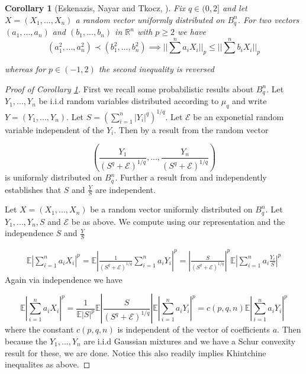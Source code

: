 \documentclass[10pt]{article}
\newcommand{\E}{\mathbb{E}}
\newcommand{\1}{\textbf{1}}
\newcommand{\R}{\mathbb{R}}
\newcommand{\normOne}[1]{\left\lvert#1\right\rvert}
\newtheorem{corollary}[theorem]{Corollary}
\theoremstyle{remark}
\theoremstyle{definition}
\begin{document}
\begin{corollary}[Eskenazis, Nayar and Tkocz, \cite{ENT}]\label{cor:ENT4}
	Fix $q \in (0,2]$ and let $X = (X_1,...,X_n)$ a random vector uniformly distributed on $B_q^n$. For two vectors $(a_1,...,a_n)$ and $(b_1,...,b_n)$ in $\R^n$ with $p \geq 2$ we have
	\begin{equation*}
		(a_1^2,...,a_n^2) \prec (b_1^2,...,b_n^2) \implies ||\sum^n a_i X_i||_p \leq ||\sum^n b_i X_i||_p
	\end{equation*}

	whereas for $p \in (-1,2)$ the second inequality is reversed
\end{corollary}

\begin{proof}[Proof of Corollary \ref{cor:ENT4}]

First we recall some probabilistic results about $B_q^n$. Let $Y_1,...,Y_n$ be i.i.d random variables distributed according to $\mu_q$ and write $Y = (Y_1,...,Y_n)$. Let $S = (\sum_{i=1}^n|Y_i|^q)^{1/q}$. Let $\mathcal{E}$ be an exponetial random variable independent of the $Y_i$. Then by a result from \cite{BGMN} the random vector


\begin{equation*}
	(\frac{Y_1}{(S^q+\mathcal{E})^{1/q}},...,\frac{Y_n}{(S^q+\mathcal{E})^{1/q}})
\end{equation*} is uniformly distributed on $B_q^n$. Further a result from \cite{RR} and independently \cite{SZ} establishes that $S$ and $\frac{Y}{S}$ are independent.


Let $X = (X_1,...,X_n)$ be a random vector uniformly distributed on $B^n_q$. Let $Y_1,...,Y_n,S$ and $\mathcal{E}$ be as above. We compute using our representation and the independence $S$ and $\frac{Y}{S}$

\begin{align*}
	\E\normOne{\sum_{i=1}^na_iX_i}^p = \E\normOne{\frac{1}{(S^q+\mathcal{E})^{1/q}}\sum_{i=1}^na_iY_i}^p = \normOne{\frac{S}{(S^q+\mathcal{E})^{1/q}}}^p \E\normOne{\sum_{i=1}^n a_i\frac{Y_i}{S}}^p 
\end{align*} Again via independence we have

\begin{equation}
	\E\normOne{\sum_{i=1}^n a_iX_i}^p = \frac{1}{\E\normOne{S}^p} \E\normOne{\frac{S}{(S^q+\mathcal{E})^{1/q}}}\E\normOne{\sum_{i=1}^n a_iY_i}^p = c(p,q,n) \E\normOne{\sum_{i=1}^na_iY_i}^p
\end{equation} where the constant $c(p,q,n)$ is independent of the vector of coefficients $a$. Then because the $Y_1,...,Y_n$ are i.i.d Gaussian mixtures and we have a Schur convexity result for these, we are done. Notice this also readily implies Khintchine inequalites as above.
\end{proof}
\end{document}
